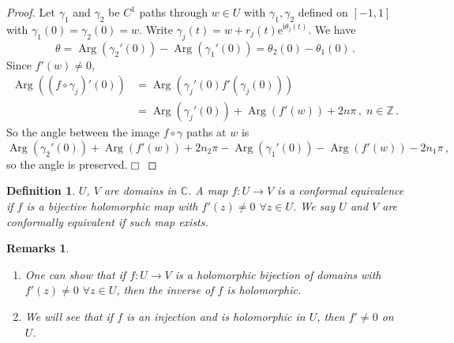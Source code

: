 \documentclass{article}
\theoremstyle{plain}\theoremheaderfont{\normalfont\itshape}\theorembodyfont{\rmfamily}\theoremseparator{.}\newtheorem*{rem}{Remark}\newtheorem*{ex}{Example}\newtheorem*{proof}{Proof}\newtheorem*{altp}{Alternative proof}\newtheorem*{con}{Consequences}\newtheorem*{notn}{Notations}\newtheorem*{cau}{Caution}\newtheorem*{term}{Terminology}\newtheorem*{keyex}{Key example}
\theoremstyle{plain}\theoremheaderfont{\normalfont\bfseries}\theorembodyfont{\rmfamily}\theoremseparator{.}\newtheorem{thm}{Theorem}[section]\newtheorem{lem}[thm]{Lemma}\newtheorem{prop}[thm]{Proposition}\newtheorem*{cor}{Corollary}\newtheorem{defn}[thm]{Definition}\newtheorem{clm}[thm]{Claim}\newtheorem{clminproof}{Claim}\newtheorem{leminproof}{Lemma}\newtheorem{app}{Application}
\theoremstyle{break}\theoremheaderfont{\normalfont\itshape}\theorembodyfont{\rmfamily}\theoremseparator{.\medskip}\newtheorem*{proofskip}{Proof}\newtheorem*{exs}{Examples}\newtheorem*{rems}{Remarks}\newtheorem*{rec}{Recall}\newtheorem*{ppts}{Properties}
\theoremstyle{break}\theoremheaderfont{\normalfont\bfseries}\theorembodyfont{\rmfamily}\theoremseparator{.\medskip}\newtheorem{lemskip}[thm]{Lemma}\newtheorem{defnskip}[thm]{Definition}\newtheorem{propskip}[thm]{Proposition}\newtheorem{thmskip}[thm]{Theorem}
\numberwithin{equation}{section}
\newcommand{\ii}{\mathrm{i}}
\newcommand{\ee}{\mathrm{e}}
\DeclareMathOperator*{\Arg}{Arg}
\newcommand{\qed}{\hfill\ensuremath{\Box}}
\newcommand{\ZZ}{\mathbb{Z}}
\newcommand{\CC}{\mathbb{C}}
\begin{document}
    \begin{proof}
        Let \(\gamma_1\) and \(\gamma_2\) be \(C^1\) paths through \(w\in U\) with \(\gamma_1,\gamma_2\) defined on \([-1,1]\) with \(\gamma_1(0)=\gamma_2(0)=w\). Write \(\gamma_j(t)=w+r_j(t)\ee^{\ii \theta_j(t)}\). We have
        \[\theta=\Arg(\gamma_2'(0))-\Arg(\gamma_1'(0))=\theta_2(0)-\theta_1(0)\,.\]
        Since \(f'(w)\ne 0\),
        \begin{align*}
            \Arg((f\circ\gamma_j)'(0))&=\Arg(\gamma_j'(0)f'(\gamma_j(0)))\\
            &=\Arg(\gamma_j'(0))+\Arg(f'(w))+2n\pi\,,\;n\in\ZZ\,.
        \end{align*}
        So the angle between the image \(f\circ\gamma\) paths at \(w\) is
        \[\Arg(\gamma_2'(0))+\Arg(f'(w))+2n_2\pi-\Arg(\gamma_1'(0))-\Arg(f'(w))-2n_1\pi\,,\]
        so the angle is preserved.\qed
    \end{proof}
    \begin{defn}
        \(U\), \(V\) are domains in \(\CC\). A map \(f:U\to V\) is a \textit{conformal equivalence} if \(f\) is a bijective holomorphic map with \(f'(z)\ne 0\) \(\forall z\in U\). We say \(U\) and \(V\) are \textit{conformally equivalent} if such map exists.
    \end{defn}
    \begin{rems}
        \begin{enumerate}[topsep=0pt,label=(\roman*)]
            \item One can show that if \(f:U\to V\) is a holomorphic bijection of domains with \(f'(z)\ne 0\) \(\forall z\in U\), then the inverse of \(f\) is holomorphic.
            \item We will see that if \(f\) is an injection and is holomorphic in \(U\), then \(f'\ne 0\) on \(U\).
        \end{enumerate}
    \end{rems}
\end{document}
